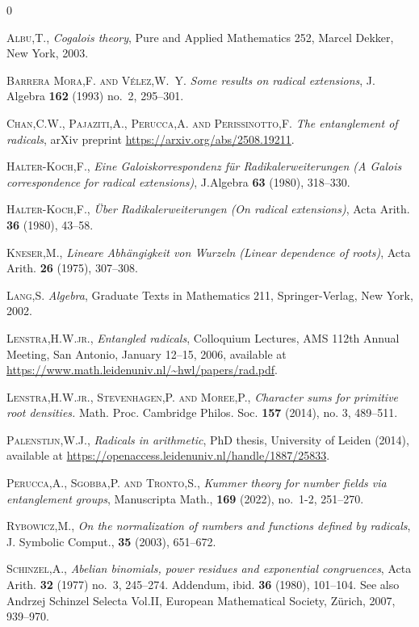 \documentclass[11pt, a4paper]{amsart}
\theoremstyle{definition}
\begin{document}
\begin{thebibliography}{0}

 \textsc{Albu,\@ T.}, \emph{Cogalois theory}, Pure and Applied Mathematics 252, Marcel Dekker, New York, 2003. 

 \textsc{Barrera Mora,\@ F. and Vélez,\@ W.~Y.} \emph{Some results on radical extensions}, J. Algebra \textbf{162} (1993) no.~2, 295--301. 

 \textsc{Chan,\@ C.W., Pajaziti,\@ A., Perucca,\@ A.  and Perissinotto,\@ F.} \emph{The entanglement of radicals}, arXiv preprint \url{https://arxiv.org/abs/2508.19211}.


 \textsc{Halter-Koch,\@ F.}, \emph{Eine Galoiskorrespondenz für Radikalerweiterungen (A Galois correspondence for radical extensions)}, J.Algebra \textbf{63} (1980), 318--330.

 \textsc{Halter-Koch,\@ F.}, \emph{Über Radikalerweiterungen (On radical extensions)}, Acta Arith. \textbf{36} (1980), 43--58. 

\textsc{Kneser,\@ M.}, \emph{Lineare Abhängigkeit von Wurzeln (Linear dependence of roots)}, 
Acta Arith. \textbf{26} (1975), 307--308. 

\textsc{Lang,\@ S.} \emph{Algebra}, Graduate Texts in Mathematics 211, Springer-Verlag, New York, 2002.

\textsc{Lenstra,\@ H.\@ W.\@ jr.}, \emph{Entangled radicals}, Colloquium Lectures, AMS 112th Annual Meeting, San Antonio, January 12--15, 2006, available at \url{https://www.math.leidenuniv.nl/~hwl/papers/rad.pdf}.

\textsc{Lenstra,\@ H.\@ W.\@ jr., Stevenhagen,\@ P. and Moree,\@ P.}, \emph{Character sums for primitive root densities.}
Math. Proc. Cambridge Philos. Soc. \textbf{157} (2014), no. 3, 489--511.

 \textsc{Palenstijn,\@ W.\@ J.}, \emph{Radicals in arithmetic}, PhD thesis, University of Leiden (2014), available at \url{https://openaccess.leidenuniv.nl/handle/1887/25833}.

 \textsc{Perucca,\@ A., Sgobba,\@ P. and Tronto,\@ S.}, \emph{Kummer theory for number fields via entanglement groups}, Manuscripta Math., \textbf{169} (2022), no.~1-2, 251--270.

\textsc{Rybowicz,\@ M.}, \emph{On the normalization of numbers and functions
defined by radicals}, J. Symbolic Comput., 
\textbf{35} (2003), 651--672.

\textsc{Schinzel,\@ A.}, \emph{Abelian binomials, power residues and exponential congruences}, Acta Arith. \textbf{32} (1977) no.~3, 245--274.
Addendum, ibid. \textbf{36} (1980), 101--104. See also Andrzej Schinzel Selecta Vol.II, European Mathematical Society, Z{\"u}rich, 2007, 939--970.

\end{thebibliography}
\end{document}
